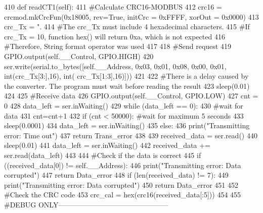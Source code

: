 \begin{DoxyCode}
410     \textcolor{keyword}{def }readCT1(self):
411         \textcolor{comment}{#Calculate CRC16-MODBUS
}
412         crc16 = crcmod.mkCrcFun(0x18005, rev=\textcolor{keyword}{True}, initCrc = 0xFFFF, xorOut = 0x0000)
413         crc\_Tx = \textcolor{stringliteral}{".%
414         \textcolor{comment}{#The crc\_Tx must include 4 hexadecimal characters.
}
415         \textcolor{comment}{#If crc\_Tx =  10, function hex() will return 0xa, which is not expected
}
416         \textcolor{comment}{#Therefore, String format operator was used
}
417     
418         \textcolor{comment}{#Send request
}
419         GPIO.output(self.\_\_Control, GPIO.HIGH)
420         ser.write(serial.to\_bytes([self.\_\_Address, 0x03, 0x01, 0x08, 0x00, 0x01, int(crc\_Tx[3:],16), int(
      crc\_Tx[1:3],16)]))
421     
422         \textcolor{comment}{#There is a delay caused by the converter. The program must wait before reading the result
}
423         sleep(0.01)
424     
425         \textcolor{comment}{#Receive data
}
426         GPIO.output(self.\_\_Control, GPIO.LOW)
427         cnt = 0
428         data\_left = ser.inWaiting()
429         \textcolor{keywordflow}{while} (data\_left == 0):
430             \textcolor{comment}{#wait for data
}
431             cnt=cnt+1
432             \textcolor{keywordflow}{if} (cnt < 50000): \textcolor{comment}{#wait for maximum 5 seconds
}
433                 sleep(0.0001)
434                 data\_left = ser.inWaiting()
435             \textcolor{keywordflow}{else}:
436                 print(\textcolor{stringliteral}{"Transmitting error: Time out"})
437                 \textcolor{keywordflow}{return} Trans\_error
438     
439         received\_data = ser.read()
440         sleep(0.01)
441         data\_left = ser.inWaiting()
442         received\_data += ser.read(data\_left)
443         
444         \textcolor{comment}{#Check if the data is correct
}
445         \textcolor{keywordflow}{if} ((received\_data[0]) != self.\_\_Address):
446             print(\textcolor{stringliteral}{"Transmitting error: Data corrupted"})
447             \textcolor{keywordflow}{return} Data\_error
448         \textcolor{keywordflow}{if} (len(received\_data) != 7):
449             print(\textcolor{stringliteral}{"Transmitting error: Data corrupted"})
450             \textcolor{keywordflow}{return} Data\_error
451         
452         \textcolor{comment}{#Check the CRC code
}
453         crc\_cal = hex(crc16(received\_data[:5]))
454 
455         \textcolor{comment}{#DEBUG ONLY-----------------------------------------------
}}
\end{DoxyCode}
